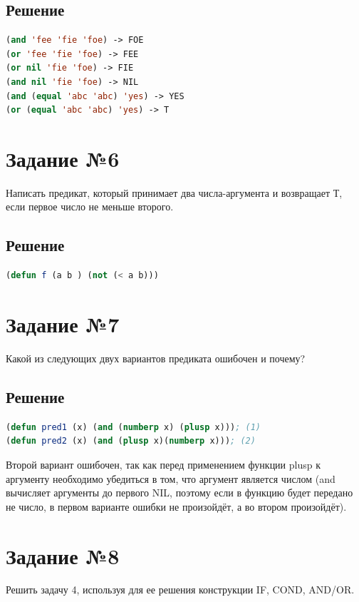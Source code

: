 \documentclass[12pt]{report}
\begin{document}
\subsection*{Решение}
\begin{lstlisting}[label=5,caption=Решение задания №5, language=lisp]
(and 'fee 'fie 'foe) -> FOE
(or 'fee 'fie 'foe) -> FEE
(or nil 'fie 'foe) -> FIE
(and nil 'fie 'foe) -> NIL
(and (equal 'abc 'abc) 'yes) -> YES
(or (equal 'abc 'abc) 'yes) -> T
\end{lstlisting}

\section*{Задание №6}
Написать предикат, который принимает два числа-аргумента и возвращает Т, если первое число не меньше второго.

\subsection*{Решение}
\begin{lstlisting}[label=6,caption=Решение задания №6, language=lisp]
(defun f (a b ) (not (< a b)))
\end{lstlisting}

\section*{Задание №7}
Какой из следующих двух вариантов предиката ошибочен и почему?

\subsection*{Решение}
\begin{lstlisting}[label=7,caption=Решение задания №7, language=lisp]
(defun pred1 (x) (and (numberp x) (plusp x))); (1)
(defun pred2 (x) (and (plusp x)(numberp x))); (2)
\end{lstlisting}
Второй вариант ошибочен, так как перед применением функции plusp к аргументу необходимо убедиться в том, что аргумент является числом (and вычисляет аргументы до первого NIL, поэтому если в функцию будет передано не число, в первом варианте ошибки не произойдёт, а во втором произойдёт).

\section*{Задание №8}
Решить задачу 4, используя для ее решения конструкции IF, COND, AND/OR.
\end{document}
